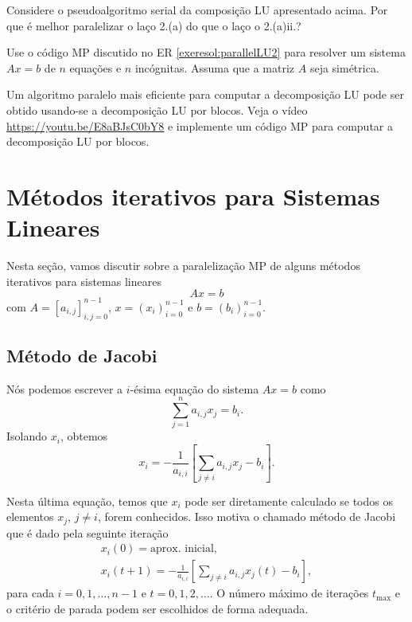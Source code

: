 \begin{exer}
  Considere o pseudoalgoritmo serial da composição LU apresentado acima. Por que é melhor paralelizar o laço 2.(a) do que o laço o 2.(a)ii.?
\end{exer}

\begin{exer}
  Use o código MP discutido no ER \ref{exeresol:parallelLU2} para resolver um sistema $Ax=b$ de $n$ equações e $n$ incógnitas. Assuma que a matriz $A$ seja simétrica.
\end{exer}

\begin{exer}
  Um algoritmo paralelo mais eficiente para computar a decomposição LU pode ser obtido usando-se a decomposição LU por blocos. Veja o vídeo \href{https://youtu.be/E8aBJsC0bY8}{https://youtu.be/E8aBJsC0bY8} e implemente um código MP para computar a decomposição LU por blocos.
\end{exer}

\section{Métodos iterativos para Sistemas Lineares}\label{cap_mp_sec_mitsislin}

Nesta seção, vamos discutir sobre a paralelização MP de alguns métodos iterativos para sistemas lineares
\begin{equation}
  Ax = b
\end{equation}
com $A = [a_{i,j}]_{i,j=0}^{n-1}$, $x = (x_i)_{i=0}^{n-1}$ e $b=(b_i)_{i=0}^{n-1}$.

\subsection{Método de Jacobi}\label{subsec:mp_mitsislin_Jacobi}

Nós podemos escrever a $i$-ésima equação do sistema $Ax = b$ como
\begin{equation}
  \sum_{j=1}^n a_{i,j}x_j = b_i.
\end{equation}
Isolando $x_{i}$, obtemos
\begin{equation}\label{eq:mp_iterJacobi}
  x_i = -\frac{1}{a_{i,i}}\left[\sum_{j\neq i}a_{i,j}x_j - b_i\right].
\end{equation}

Nesta última equação, temos que $x_i$ pode ser diretamente calculado se todos os elementos $x_j$, $j\neq i$, forem conhecidos. Isso motiva o chamado método de Jacobi que é dado pela seguinte iteração
\begin{gather}
  x_i(0) = \text{aprox. inicial},\\
  x_i(t+1) = -\frac{1}{a_{i,i}}\left[\sum_{j\neq i}a_{i,j}x_j(t) - b_i\right],\label{eq:mp_jacobi_xi}
\end{gather}
para cada $i=0,1,\dotsc,n-1$ e $t=0,1,2,\ldots$. O número máximo de iterações $t_{\text{max}}$ e o critério de parada podem ser escolhidos de forma adequada.

